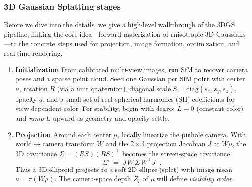 \begin{enrichment}
\begin{enrichment}
\begin{enrichment}
        \subsubsection{3D Gaussian Splatting stages}\label{enr:subsubsec_chapter23_3dgs_overview}
    
        Before we dive into the details, we give a high-level walkthrough of the 3DGS pipeline, linking the core idea—forward rasterization of anisotropic 3D Gaussians—to the concrete steps used for projection, image formation, optimization, and real-time rendering.
        
        \begin{enumerate}
            \item \textbf{Initialization} \; From calibrated multi-view images, run SfM to recover camera poses and a sparse point cloud. Seed one Gaussian per SfM point with center $\mu$, rotation $R$ (via a unit quaternion), diagonal scale $S=\mathrm{diag}(s_x,s_y,s_z)$, opacity $a$, and a small set of real spherical-harmonics (SH) coefficients for view-dependent color. For stability, begin with degree $L{=}0$ (constant color) and \emph{ramp} $L$ upward as geometry and opacity settle.
            
            \item \textbf{Projection} \; Around each center $\mu$, locally linearize the pinhole camera. With world$\to$camera transform $W$ and the $2{\times}3$ projection Jacobian $J$ at $W\mu$, the 3D covariance $\Sigma=(RS)(RS)^{\top}$ becomes the screen-space covariance
            \[
            \Sigma' \;=\; J\,W\,\Sigma\,W^{\top}J^{\top}.
            \]
            Thus a 3D ellipsoid projects to a soft 2D ellipse (splat) with image mean $u=\pi(W\mu)$. The camera-space depth $Z_c$ of $\mu$ will define \emph{visibility order}.
            

\end{enumerate}
\end{enrichment}
\end{enrichment}
\end{enrichment}
